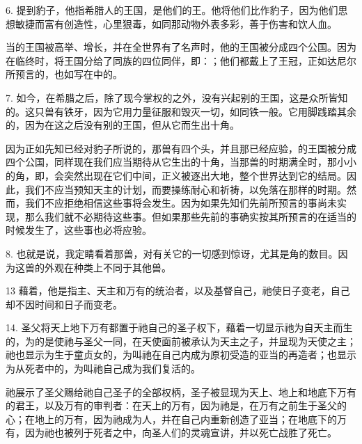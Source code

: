 6. 提到豹子，他指希腊人的王国，是他们的王。他将他们比作豹子，因为他们思想敏捷而富有创造性，心里狠毒，如同那动物外表多彩，善于伤害和饮人血。\par

当的王国被高举、增长，并在全世界有了名声时，他的王国被分成四个公国。因为在临终时，将王国分给了同族的四位同伴，即：；他们都戴上了王冠，正如达尼尔所预言的，也如写在中的。\par

7. 如今，在希腊之后，除了现今掌权的之外，没有兴起别的王国，这是众所皆知的。这只兽有铁牙，因为它用力量征服和毁灭一切，如同铁一般。它用脚践踏其余的，因为在这之后没有别的王国，但从它而生出十角。\par

因为正如先知已经对豹子所说的，那兽有四个头，并且那已经应验，的王国被分成四个公国，同样现在我们应当期待从它生出的十角，当那兽的时期满全时，那小小的角，即，会突然出现在它们中间，正义被逐出大地，整个世界达到它的结局。因此，我们不应当预知天主的计划，而要操练耐心和祈祷，以免落在那样的时期。然而，我们不应拒绝相信这些事将会发生。因为如果先知们先前所预言的事尚未实现，那么我们就不必期待这些事。但如果那些先前的事确实按其所预言的在适当的时候发生了，这些事也必将应验。\par

8. 也就是说，我定睛看着那兽，对有关它的一切感到惊讶，尤其是角的数目。因为这兽的外观在种类上不同于其他兽。\par

13 藉着，他是指主、天主和万有的统治者，以及基督自己，祂使日子变老，自己却不因时间和日子而变老。\par

14. 圣父将天上地下万有都置于祂自己的圣子权下，藉着一切显示祂为自天主而生的，为的是使祂与圣父一同，在天使面前被承认为天主之子，并显现为天使之主；祂也显示为生于童贞女的，为叫祂在自己内成为原初受造的亚当的再造者；也显示为从死者中的，为叫祂自己成为我们复活的。\par

祂展示了圣父赐给祂自己圣子的全部权柄，圣子被显现为天上、地上和地底下万有的君王，以及万有的审判者：在天上的万有，因为祂是，在万有之前生于圣父的心；在地上的万有，因为祂成为人，并在自己内重新创造了亚当；在地底下的万有，因为祂也被列于死者之中，向圣人们的灵魂宣讲，并以死亡战胜了死亡。\par

